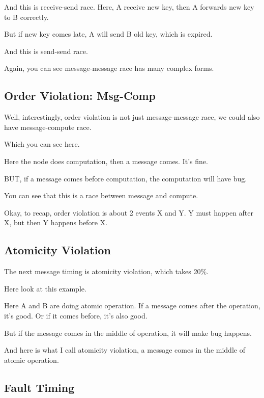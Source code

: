 And this is receive-send race. Here, A receive new key, then A forwards new key
to B correctly.

But if new key comes late, A will send B old key, which is expired.

%

And this is send-send race.

Again, you can see message-message race has many complex forms.

\subsection{Order Violation: Msg-Comp}

Well, interestingly, order violation is not just message-message race, we could
also have message-compute race. 

Which you can see here.

Here the node does computation, then a message comes. It's fine.

BUT, if a message comes before computation, the computation will have bug.

You can see that this is a race between message and compute.

Okay, to recap, order violation is about 2 events X and Y. Y must happen after
X, but then Y happens before X.

\subsection{Atomicity Violation}

The next message timing is atomicity violation, which takes 20\%. 

Here look at this example.

Here A and B are doing atomic operation. If a message comes after the operation,
it's good. Or if it comes before, it's also good.

But if the message comes in the middle of operation, it will make bug happens.

And here is what I call atomicity violation, a message comes in the middle of
atomic operation.

\subsection{Fault Timing}


